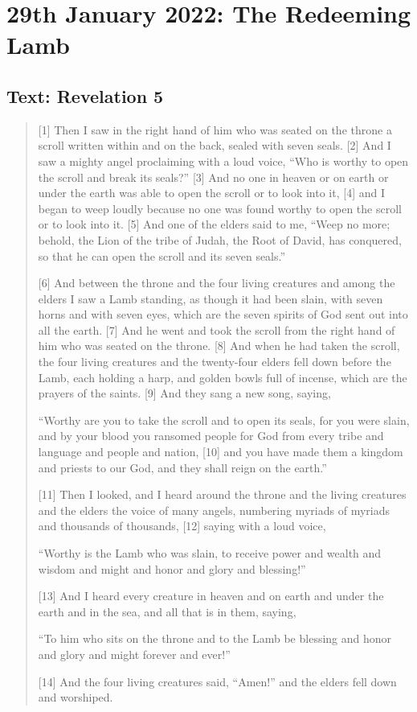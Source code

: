 \section{29th January 2022: The Redeeming Lamb}
\subsection*{Text: Revelation 5}
  \begin{quote}
    [1] Then I saw in the right hand of him who was seated on the throne a scroll written within and on the back, sealed with seven seals. [2] And I saw a mighty angel proclaiming with a loud voice, “Who is worthy to open the scroll and break its seals?” [3] And no one in heaven or on earth or under the earth was able to open the scroll or to look into it, [4] and I began to weep loudly because no one was found worthy to open the scroll or to look into it. [5] And one of the elders said to me, “Weep no more; behold, the Lion of the tribe of Judah, the Root of David, has conquered, so that he can open the scroll and its seven seals.”

    [6] And between the throne and the four living creatures and among the elders I saw a Lamb standing, as though it had been slain, with seven horns and with seven eyes, which are the seven spirits of God sent out into all the earth. [7] And he went and took the scroll from the right hand of him who was seated on the throne. [8] And when he had taken the scroll, the four living creatures and the twenty-four elders fell down before the Lamb, each holding a harp, and golden bowls full of incense, which are the prayers of the saints. [9] And they sang a new song, saying,

    “Worthy are you to take the scroll
        and to open its seals,
    for you were slain, and by your blood you ransomed people for God
        from every tribe and language and people and nation,
    [10] and you have made them a kingdom and priests to our God,
        and they shall reign on the earth.”

    [11] Then I looked, and I heard around the throne and the living creatures and the elders the voice of many angels, numbering myriads of myriads and thousands of thousands, [12] saying with a loud voice,

    “Worthy is the Lamb who was slain,
    to receive power and wealth and wisdom and might
    and honor and glory and blessing!”

    [13] And I heard every creature in heaven and on earth and under the earth and in the sea, and all that is in them, saying,

    “To him who sits on the throne and to the Lamb
    be blessing and honor and glory and might forever and ever!”

    [14] And the four living creatures said, “Amen!” and the elders fell down and worshiped.
  \end{quote}
